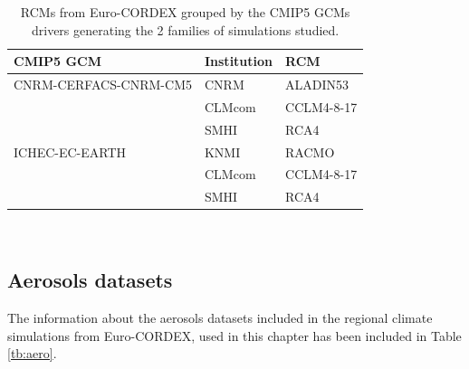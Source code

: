 \begin{table}[h]
\footnotesize
\begin{tabular}{>{\raggedrigth}m{4.5cm}>{\raggedright}m{3cm}>{\raggedright}m{3cm}}
\toprule 
CMIP5 GCM & Institution  & RCM  \tabularnewline
\midrule
CNRM-CERFACS-CNRM-CM5 & CNRM & ALADIN53 \tabularnewline
&CLMcom&CCLM4-8-17\tabularnewline 
&SMHI&RCA4\tabularnewline
\midrule  
ICHEC-EC-EARTH&KNMI&RACMO\tabularnewline
&CLMcom&CCLM4-8-17\tabularnewline
&SMHI&RCA4\tabularnewline
\bottomrule
\end{tabular}\\
\caption[RCMs from Euro-CORDEX grouped by the CMIP5 GCMs drivers generating the 2 families of simulations studied]{\label{tb:families}RCMs from Euro-CORDEX grouped by the CMIP5 GCMs drivers generating the 2 families of simulations studied.}
\end{table}
\normalsize



\subsection{Aerosols datasets}


The information about the aerosols datasets included in the regional climate simulations from Euro-CORDEX, used in this chapter has been included in Table \ref{tb:aero}. %


